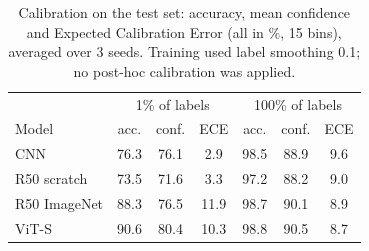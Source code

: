 \begin{table}[t]
\centering
\small
\setlength{\tabcolsep}{4pt}
\begin{tabular}{|l|ccc|ccc|}
\hline
 & \multicolumn{3}{c|}{1\% of labels} & \multicolumn{3}{c|}{100\% of labels} \\
Model & acc. & conf. & ECE & acc. & conf. & ECE \\ \hline \hline
CNN & 76.3 & 76.1 & 2.9 & 98.5 & 88.9 & 9.6 \\
R50 scratch & 73.5 & 71.6 & 3.3 & 97.2 & 88.2 & 9.0 \\
R50 ImageNet & 88.3 & 76.5 & 11.9 & 98.7 & 90.1 & 8.9 \\
ViT-S & 90.6 & 80.4 & 10.3 & 98.8 & 90.5 & 8.7 \\
\hline
\end{tabular}
\caption{Calibration on the test set: accuracy, mean confidence and Expected Calibration Error (all in \%, 15 bins), averaged over 3 seeds. Training used label smoothing 0.1; no post-hoc calibration was applied.}
\label{tab:ece}
\end{table}